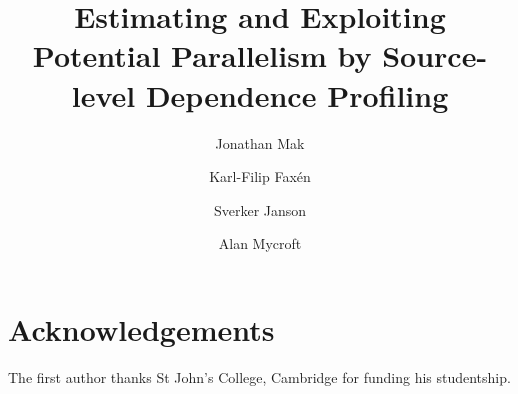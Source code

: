 \documentclass{llncs}
\begin{document}
\pagestyle{plain}

\title{Estimating and Exploiting Potential Parallelism by Source-level Dependence Profiling}

\author{Jonathan Mak
   \and Karl-Filip Fax\'en
   \and Sverker Janson
   \and Alan Mycroft
}

          
\maketitle 





\section*{Acknowledgements}

The first author thanks St John's College, Cambridge for funding his studentship.


{}
\end{document}
